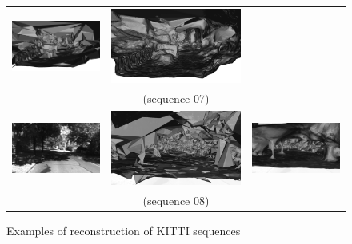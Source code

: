 \begin{figure}[tp]
\begin{tabular}{ccc}
\includegraphics[height=0.18\textwidth]{./img/ch-incr-dens/07ainit00}&
\includegraphics[height=0.18\textwidth]{./img/ch-incr-dens/07aref00}\\
&(sequence 07)&\\
\includegraphics[height=0.18\textwidth]{./img/ch-incr-dens/08aorig00}&
\includegraphics[height=0.18\textwidth]{./img/ch-incr-dens/08ainit00}&
\includegraphics[height=0.18\textwidth]{./img/ch-incr-dens/08aref00}\\
&(sequence 08)&\\

\end{tabular}
\caption{Examples of reconstruction of KITTI sequences }
\label{fig:kitti2}
\end{figure}


